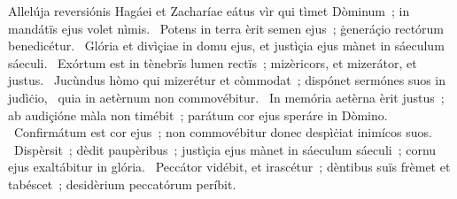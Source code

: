 { Allelúja reversiónis Hagáei et Zacharíae}
{%
eátus vìr qui tìmet Dòminum~; in mandátïs ejus volet nìmis. 
~Potens in terra èrit semen ejus~; ġeneráçio rectórum benedicétur. 
~Glória et divìçiae in domu ejus, et justìçia ejus mànet in sáeculum sáeculi. 
~Exórtum est in tènebrïs lumen rectïs~; mizèricors, et mizerátor, et justus. 
~Jucùndus hòmo qui mizerétur et còmmodat~; dispónet sermónes suos in judìċio, 
~quia in aetèrnum non commovébitur. 
~In memória aetèrna èrit justus~; ab audiçióne màla non timébit~; parátum cor ejus speráre in Dòmino. 
~Confirmátum est cor ejus~; non commovébitur donec despìċiat inimícos suos. 
~Dispèrsit~; dèdit paupèribus~; justìçia ejus mànet in sáeculum sáeculi~; cornu ejus exaltábitur in glória. 
~Peccátor vidébit, et irascétur~; dèntibus suïs frèmet et tabéscet~; desidèrium peccatórum períbit. 
}
